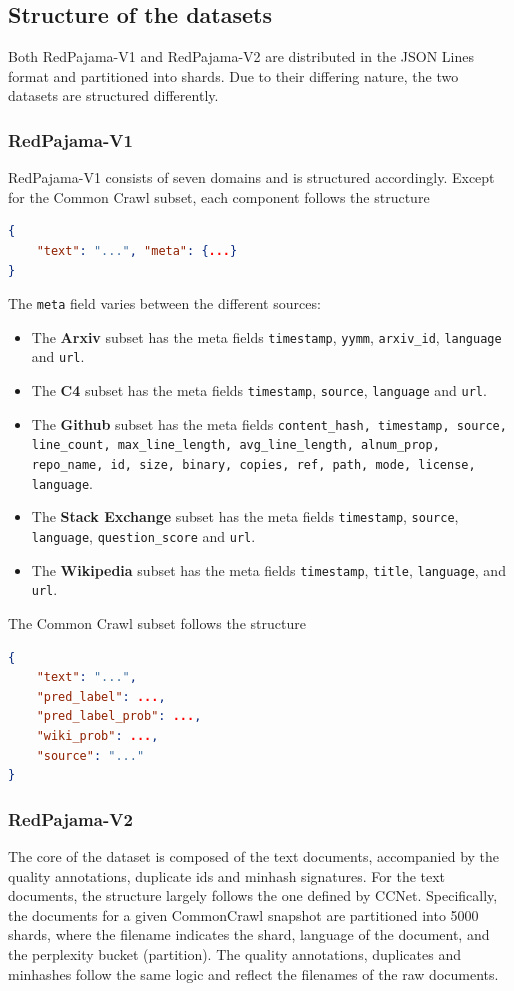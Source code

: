 \documentclass{article}
\begin{document}
\subsection{Structure of the datasets}
Both RedPajama-V1 and RedPajama-V2 are distributed in the JSON Lines format and partitioned into shards. Due to their differing nature, the two datasets are structured differently.

\subsubsection{RedPajama-V1}
RedPajama-V1 consists of seven domains and is structured accordingly. Except for the Common Crawl subset, each component follows the structure
\begin{lstlisting}[language=json]
{
    "text": "...", "meta": {...}
}
\end{lstlisting}
The \texttt{meta} field varies between the different sources:
\begin{itemize}%
    \item The {\bf Arxiv} subset has the meta fields \texttt{timestamp}, \texttt{yymm}, \texttt{arxiv\_id}, \texttt{language} and \texttt{url}.
    \item The {\bf C4} subset has the meta fields \texttt{timestamp}, \texttt{source}, \texttt{language} and \texttt{url}.
    \item The {\bf Github} subset has the meta fields \texttt{content\_hash, timestamp, source, line\_count, max\_line\_length, avg\_line\_length, alnum\_prop, repo\_name, id, size, binary, copies, ref, path, mode, license, language}.
    \item The {\bf Stack Exchange} subset has the meta fields  \texttt{timestamp}, \texttt{source}, \texttt{language}, \texttt{question\_score} and \texttt{url}.
    \item The {\bf Wikipedia} subset has the meta fields \texttt{timestamp}, \texttt{title}, \texttt{language}, and \texttt{url}.
\end{itemize}
The Common Crawl subset follows the structure
\begin{lstlisting}[language=json]
{
    "text": "...",
    "pred_label": ..., 
    "pred_label_prob": ..., 
    "wiki_prob": ..., 
    "source": "..."
}
\end{lstlisting}

\subsubsection{RedPajama-V2}
The core of the dataset is composed of the text documents, accompanied by the quality annotations, duplicate ids and minhash signatures. For the text documents, the structure largely follows the one defined by CCNet. Specifically, the documents for a given CommonCrawl snapshot are partitioned into 5000 shards, where the filename indicates the shard, language of the document, and the perplexity bucket (partition). The quality annotations, duplicates and minhashes follow the same logic and reflect the filenames of the raw documents. 
\end{document}

